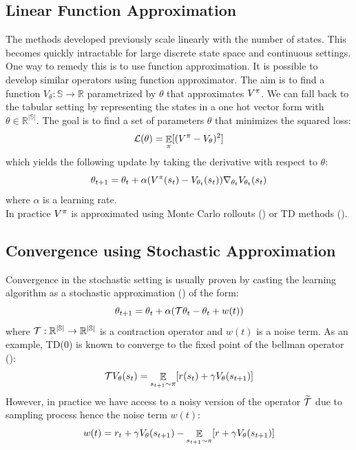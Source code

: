 \subsection{Linear Function Approximation}
The methods developed previously scale linearly with the number of states. This becomes quickly intractable for large discrete state space and continuous settings. One way to remedy this is to use function approximation. It is possible to develop similar operators using function approximator.
The aim is to find a function $V_\theta: \mathbb{S} \rightarrow \mathbb{R}$ parametrized by $\theta$ that approximates $V^{\pi}$. We can fall back to the tabular setting by representing the states in a one hot vector form with $\theta \in \mathbb{R^{|\mathbb{S}|}}$. The goal is to find a set of parameters $\theta$ that minimizes the squared loss:
\begin{equation}\label{simple_loss}
    \mathcal{L}(\theta) = \mathop{\mathbb{E}}_{\pi} [(V^{\pi} - V_\theta)^2]
\end{equation}
which yields the following update by taking the derivative with respect to $\theta$:
\begin{equation}
    \theta_{t+1} = \theta_t + \alpha (V^{\pi}(s_t) - V_{\theta_t}(s_t)) \nabla_{\theta_t} V_{\theta_t}(s_t)
\end{equation}
where $\alpha$ is a learning rate.\\
In practice $V^{\pi}$ is approximated using Monte Carlo rollouts (\citep{suttonreinforcement}) or TD methods (\citep{sutton1988learning}).

\subsection{Convergence using Stochastic Approximation}
Convergence in the stochastic setting is usually proven by casting the learning algorithm as a stochastic approximation (\citep{tsitsiklis1994asynchronous,borkar2009stochastic,borkar2000ode}) of the form:
\begin{equation}\label{stoch}
    \theta_{t+1} = \theta_t + \alpha( \mathcal{T} \theta_t  - \theta_t + w(t)) 
\end{equation}
where $\mathcal{T}: \mathbb{R^{|\mathbb{S}|}} \rightarrow \mathbb{R^{|\mathbb{S}|}}$ is a contraction operator and $w(t)$ is a noise term. 
As an example, TD(0) is known to converge to the fixed point of the bellman operator (\citep{sutton1988learning}):
\begin{equation}
    \mathcal{T} V_{\theta}(s_t) = \mathop{\mathbb{E}}_{s_{t+1} \sim \pi} [r(s_t) + \gamma V_{\theta}(s_{t+1})]
\end{equation}
However, in practice we have access to a noisy version of the operator $\widetilde{\mathcal{T}}$ due to sampling process hence the noise term $w(t)$:
\begin{equation}
    w(t) = r_t + \gamma V_{\theta} (s_{t+1}) - \mathop{\mathbb{E}}_{s_{t+1} \sim \pi} [r + \gamma V_{\theta}(s_{t+1})]
\end{equation}


